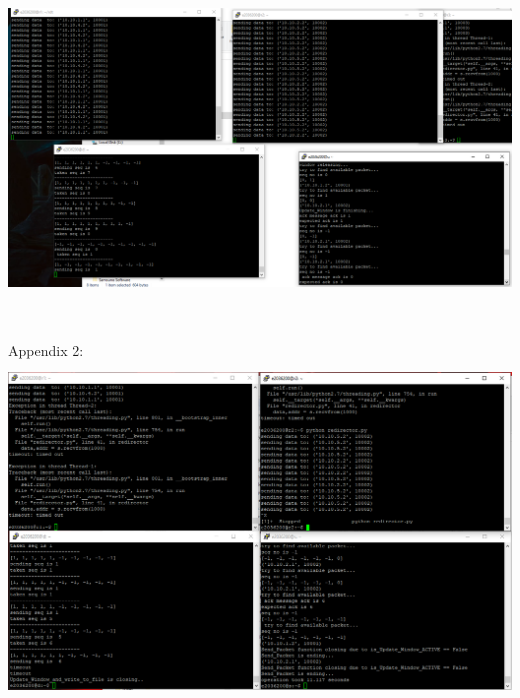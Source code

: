 \documentclass[conference]{IEEEtran}
\begin{document}
\includegraphics[width = 145mm, height = 90mm]{multihoming2.png} \\ \qquad \\



Appendix 2:\\

\includegraphics[width = 145mm, height = 90mm]{multihoming_linkdown.png} \\ \qquad \\
\end{document}
